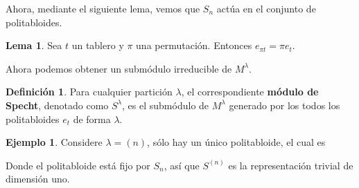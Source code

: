 \documentclass[12pt]{book}
\theoremstyle{definition}
\newtheorem{definition}[theorem]{Definición}
\newtheorem{example}[theorem]{Ejemplo}
\newtheorem{lemma}[theorem]{Lema}
\newcounter{in}
\newcounter{ini}
\begin{document}
Ahora, mediante el siguiente lema, vemos que $S_{n}$ actúa en el
conjunto de politabloides.
\begin{lemma}
  \label{lema}
  Sea $t$ un tablero y $\pi$ una permutación. Entonces $e_{\pi t}=\pi e_{t}$.
\end{lemma}

Ahora podemos obtener un submódulo irreducible de
$M^{\lambda}$.
\begin{definition}
  Para cualquier partición $\lambda$, el correspondiente
  \textbf{módulo de Specht}, denotado como $S^{\lambda}$, es el submódulo
  de $M^{\lambda}$ generado por los todos los politabloides $e_{t}$ de
  forma $\lambda$.
\end{definition}
\begin{example}
  \label{n}
  Considere $\lambda=(n)$, sólo hay un único politabloide, el cual es
  \begin{center}
  \end{center}
Donde el politabloide está fijo por $S_{n}$, así que $S^{(n)}$ es la
representación trivial de dimensión uno. 
\end{example}
\end{document}
